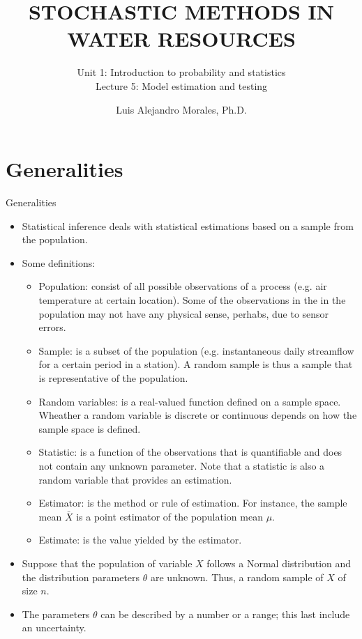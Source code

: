 \documentclass[8pt]{beamer}
\title{STOCHASTIC METHODS IN WATER RESOURCES}
\subtitle{Unit 1: Introduction to probability and statistics \\ Lecture 5: Model estimation and testing}
\author{Luis Alejandro Morales, Ph.D.}
\institute{Universidad Nacional de Colombia \\ Department of Civil and Agriculture Engineering} %
\renewcommand{\emph}[1]{\textcolor{myorange}{#1}}
\begin{document}
\begin{frame}
    \titlepage
\end{frame}

\section{Generalities}
\begin{frame}{Generalities}
    \begin{itemize}
        \item Statistical inference deals with  statistical estimations based on a \emph{sample} from the \emph{population}.
        \item Some definitions:
            \begin{itemize}
                \item \alert{Population}: consist of all possible observations of a process (e.g. air temperature at certain location). Some of the observations in the in the population may not have any physical sense, perhabs, due to sensor errors. 
                \item \alert{Sample}: is a subset of the population (e.g. instantaneous daily streamflow for a certain period in a station). A \emph{random sample} is thus a sample that is representative of the population.
                \item \alert{Random variables}: is a \emph{real-valued function} defined on a \emph{sample space}. Wheather a random variable is \emph{discrete} or \emph{continuous} depends on how the sample space is defined. 
                \item \alert{Statistic}: is a function of the observations that is quantifiable and does not contain any unknown parameter. Note that a \emph{statistic} is also a random variable that provides an \emph{estimation}.
                \item \alert{Estimator}: is the method or rule of estimation. For instance, the \emph{sample mean} $\bar{X}$ is a point estimator of the \emph{population mean} $\mu$. 
                \item \alert{Estimate}: is the value yielded by the estimator. 
                 \end{itemize}
             \item Suppose that the population of variable $X$ follows a \emph{Normal distribution} and the distribution parameters $\theta$ are unknown. Thus, a random sample of $X$ of size $n$.
             \item The parameters $\theta$ can be described by a number or a range; this last include an uncertainty. 
    \end{itemize}
\end{frame}
\end{document}
